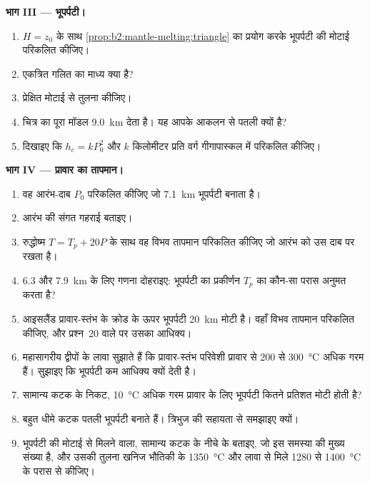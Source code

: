 \begin{problem}[{सप्ताहांत समस्या --- प्रावार रुद्धोष्म से महासागरीय भूपर्पटी की
मोटाई तक, और वापस प्रावार के तापमान तक}]
\noindent\textbf{भाग III --- भूपर्पटी।}
\begin{enumerate}[resume]
\item $H = z_0$ के साथ \cref{prop:b2:mantle-melting:triangle} का प्रयोग करके
भूपर्पटी की मोटाई परिकलित कीजिए।
\item एकत्रित गलित का माध्य  क्या है?
\item प्रेक्षित मोटाई से तुलना कीजिए।
\item चित्र का पूरा मॉडल \qty{9.0}{km} देता है। यह आपके आकलन से
पतली क्यों है?
\item दिखाइए कि $h_c = k P_0^2$ और $k$ किलोमीटर प्रति वर्ग
गीगापास्कल में परिकलित कीजिए।
\end{enumerate}

\noindent\textbf{भाग IV --- प्रावार का तापमान।}
\begin{enumerate}[resume]
\item वह आरंभ-दाब $P_0$ परिकलित कीजिए जो \qty{7.1}{km} भूपर्पटी बनाता है।
\item आरंभ की संगत गहराई बताइए।
\item रुद्धोष्म $T = T_p + 20P$ के साथ वह विभव तापमान परिकलित कीजिए जो
आरंभ को उस दाब पर रखता है।
\item 6.3 और \qty{7.9}{km} के लिए गणना दोहराइए: भूपर्पटी का
प्रकीर्णन $T_p$ का कौन-सा परास अनुमत करता है?
\item आइसलैंड प्रावार-स्तंभ के क्रोड के ऊपर भूपर्पटी \qty{20}{km} मोटी है। वहाँ
विभव तापमान परिकलित कीजिए, और प्रश्न~20 वाले पर उसका आधिक्य।
\item महासागरीय द्वीपों के लावा सुझाते हैं कि प्रावार-स्तंभ परिवेशी प्रावार से 200 से \qty{300}{\celsius} अधिक गरम
हैं। सुझाइए कि भूपर्पटी कम आधिक्य क्यों देती है।
\item सामान्य कटक के निकट, \qty{10}{\celsius} अधिक गरम प्रावार के लिए भूपर्पटी कितने प्रतिशत
मोटी होती है?
\item बहुत धीमे कटक पतली भूपर्पटी बनाते हैं। त्रिभुज की सहायता से समझाइए क्यों।
\item भूपर्पटी की मोटाई से मिलने वाला, सामान्य कटक के नीचे के 
बताइए, जो इस समस्या की मुख्य संख्या है, और उसकी तुलना
खनिज भौतिकी के \qty{1350}{\celsius} और लावा से मिले 1280 से
\qty{1400}{\celsius} के परास से कीजिए।
\end{enumerate}
\end{problem}
